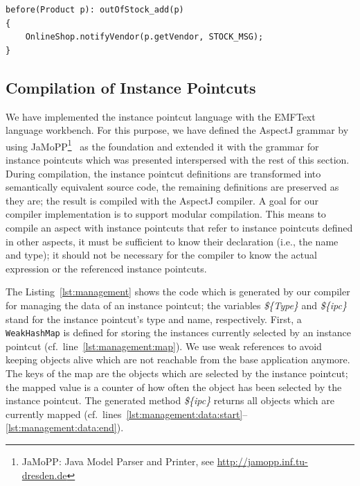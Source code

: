 \documentclass{acm_proc_article-sp}
\newcommand{\lstinln}[1]{\lstinline~#1~}
\begin{document}
\begin{lstlisting}[float=h!, caption={Set monitoring pointcut used to notify vendors}, label={lst:monitor1}]
before(Product p): outOfStock_add(p)
{
	OnlineShop.notifyVendor(p.getVendor, STOCK_MSG);
}
\end{lstlisting}

\subsection{Compilation of Instance Pointcuts}


We have implemented the instance pointcut language with the EMFText language workbench.
For this purpose, we have defined the AspectJ grammar by using JaMoPP\footnote{JaMoPP: Java Model Parser and Printer, see \url{http://jamopp.inf.tu-dresden.de}}~\cite{jamopp2010} as the foundation and extended it with the grammar for instance pointcuts which was presented interspersed with the rest of this section.
During compilation, the instance pointcut definitions are transformed into semantically equivalent source code, the remaining definitions are preserved as they are; the result is compiled with the AspectJ compiler.
A goal for our compiler implementation is to support modular compilation.
This means to compile an aspect with instance pointcuts that refer to instance pointcuts defined in other aspects, it must be sufficient to know their declaration (i.e., the name and type); it should not be necessary for the compiler to know the actual expression or the referenced instance pointcuts.

The Listing~\ref{lst:management} shows the code which is generated by our compiler for managing the data of an instance pointcut; the variables \emph{\$\{Type\}} and \emph{\$\{ipc\}} stand for the instance pointcut's type and name, respectively.
First, a \lstinln{WeakHashMap} is defined for storing the instances currently selected by an instance pointcut (cf.\ line~\ref{lst:management:map}).
We use weak references to avoid keeping objects alive which are not reachable from the base application anymore.
The keys of the map are the objects which are selected by the instance pointcut; the mapped value is a counter of how often the object has been selected by the instance pointcut.
The generated method \emph{\$\{ipc\}} returns all objects which are currently mapped (cf.\ lines~\ref{lst:management:data:start}--\ref{lst:management:data:end}).
\end{document}
